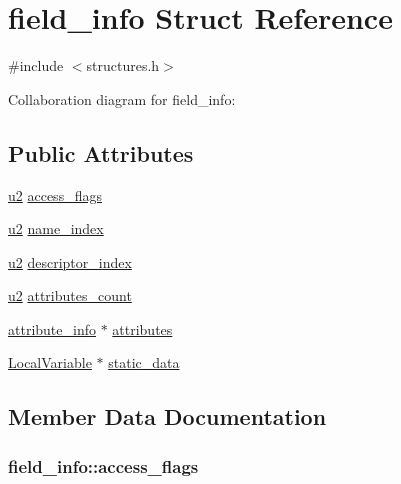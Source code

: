 \hypertarget{structfield__info}{}\section{field\+\_\+info Struct Reference}
\label{structfield__info}


{\ttfamily \#include $<$structures.\+h$>$}



Collaboration diagram for field\+\_\+info\+:
\subsection*{Public Attributes}
\begin{DoxyCompactItemize}
\item 
\hyperlink{structures_8h_a55ef8d87fd202b8417704c089899c5b9}{u2} \hyperlink{structfield__info_aa622dc9a5b5353d2f3eb2f416dacab4b}{access\+\_\+flags}
\item 
\hyperlink{structures_8h_a55ef8d87fd202b8417704c089899c5b9}{u2} \hyperlink{structfield__info_a425e3ae85badd81c67ef00acca85ad9e}{name\+\_\+index}
\item 
\hyperlink{structures_8h_a55ef8d87fd202b8417704c089899c5b9}{u2} \hyperlink{structfield__info_a12dd492b7fb1d61da1ac14938d97b07f}{descriptor\+\_\+index}
\item 
\hyperlink{structures_8h_a55ef8d87fd202b8417704c089899c5b9}{u2} \hyperlink{structfield__info_a83bfa4ff84a608e3dbd1c3968ebe1b80}{attributes\+\_\+count}
\item 
\hyperlink{structattribute__info}{attribute\+\_\+info} $\ast$ \hyperlink{structfield__info_afdda114944ae5eaae78c237f99257108}{attributes}
\item 
\hyperlink{structLocalVariable}{Local\+Variable} $\ast$ \hyperlink{structfield__info_a90fc91c18e08fe2325cdeded20ee4578}{static\+\_\+data}
\end{DoxyCompactItemize}


\subsection{Member Data Documentation}
\subsubsection[{\texorpdfstring{access\+\_\+flags}{access_flags}}]{ field\+\_\+info\+::access\+\_\+flags}\hypertarget{structfield__info_aa622dc9a5b5353d2f3eb2f416dacab4b}{}\label{structfield__info_aa622dc9a5b5353d2f3eb2f416dacab4b}
